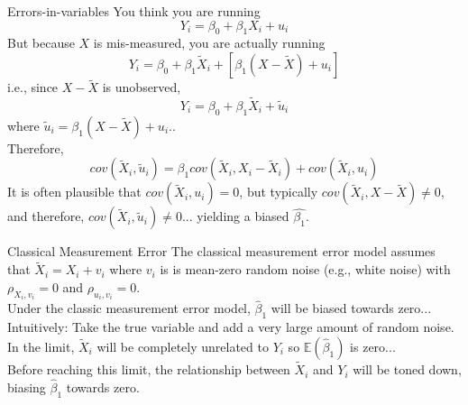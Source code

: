 \documentclass[notes,10pt, aspectratio=169]{beamer}
\begin{document}
\begin{frame}{Errors-in-variables}
You think you are running
\begin{equation*}
    Y_i = \beta_0 + \beta_1 X_i + u_i
\end{equation*}
But because $X$ is mis-measured, you are actually running
\begin{equation*}
    Y_i = \beta_0 + \beta_1 \tilde{X}_i + [\beta_1 (X-\tilde{X}) + u_i]
\end{equation*}
i.e., since $X-\tilde{X}$ is unobserved,
\begin{equation*}
    Y_i = \beta_0 + \beta_1 \tilde{X}_i + \tilde{u}_i
\end{equation*}
where $\tilde{u}_i=\beta_1 (X-\tilde{X}) + u_i$..\\[1em]

Therefore,
\begin{equation*}
    cov(\tilde{X}_i, \tilde{u}_i) = \beta_1 cov(\tilde{X}_i, X_i-\tilde{X}_i) + cov(\tilde{X}_i, u_i)
\end{equation*}
It is often plausible that $cov(\tilde{X}_i, u_i)=0$, but typically $cov(\tilde{X}_i, X-\tilde{X})\neq 0$, and therefore, $cov(\tilde{X}_i, \tilde{u}_i) \neq 0$... yielding a biased $\hat{\beta_1}$.


\end{frame}

\begin{frame}{Classical Measurement Error}
The classical measurement error model assumes that $\tilde{X}_i=X_i+v_i$ where $v_i$ is is mean-zero random noise (e.g., white noise) with $\rho_{X_i, v_i}=0$ and $\rho_{u_i, v_i}=0$.\\[1em]

Under the classic measurement error model, $\hat{\beta}_1$ will be biased towards zero...\\[1em]

Intuitively: Take the true variable and add a very large amount of random noise. In the limit, $\tilde{X}_i$ will be completely unrelated to $Y_i$ so $\mathbb{E}(\hat{\beta}_1)$ is zero...\\[1em]

Before reaching this limit, the relationship between  $\tilde{X}_i$ and $Y_i$ will be toned down, biasing $\hat{\beta}_1$ towards zero.\\[1em]

\end{frame}
\end{document}
